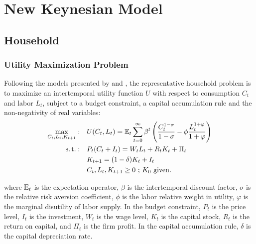 \documentclass[
thesis.tex
]{subfiles}
\begin{document}
	
	\newpage
	
\section{New Keynesian Model}
	
	{
		\setlength{\parskip}{1pt}
		\singlespacing
		\localtableofcontents
	}

\newpage


	\subsection{Household}
	
	\subsubsection*{Utility Maximization Problem}
	
	
	Following the models presented by \textcite{costa_junior_understanding_2016} and \textcite{solis-garcia_ucb_2022}, the representative household problem is to maximize an intertemporal utility function $U$ with respect to consumption $C_t$ and labor $L_t$, subject to a budget constraint, a capital accumulation rule and the non-negativity of real variables:
	\begin{align}
		\label{eq:household-utility-function}
		\max_{C_t,L_t,K_{t+1}}: \quad & U(C_t,L_t) = {\mathbb{E}_{t}} \sum_{t=0}^{\infty} \beta^t \left(\frac{C_t^{1-\sigma}}{1-\sigma} - \phi \frac{L_t^{1+\varphi}}{1+\varphi} \right) \\
		\label{eq:household-budget-constraint}
		\operatorname{s.t.}: \quad & P_t (C_t + I_t) = W_t L_t + R_t K_t + \Pi_t \\
		\label{eq:law-of-motion-for-capital}
		\quad & K_{t+1} = (1-\delta)K_t + I_t \\
		\quad & C_t,L_t,K_{t+1} \geq 0 \text{ ; $K_0$ given.} \nonumber
	\end{align}
	
	where ${\mathbb{E}_{t}}$ is the expectation operator, $\beta$ is the intertemporal discount factor, $\sigma$ is the relative risk aversion coefficient, $\phi$ is the labor relative weight in utility, $\varphi$ is the marginal disutility of labor supply. In the budget constraint, $P_t$ is the price level, $I_t$ is the investment, $W_t$ is the wage level, $K_t$ is the capital stock, $R_t$ is the return on capital, and $\Pi_t$ is the firm profit. In the capital accumulation rule, $\delta$ is the capital depreciation rate.
	
\end{document}
